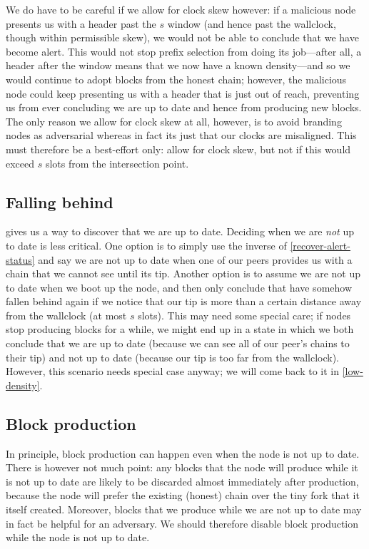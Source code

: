 We do have to be careful if we allow for clock skew however: if a malicious node
presents us with a header past the $s$ window (and hence past the wallclock,
though within permissible skew), we would not be able to conclude that we have
become alert. This would not stop prefix selection from doing its job---after
all, a header after the window means that we now have a known density---and so
we would continue to adopt blocks from the honest chain; however, the malicious
node could keep presenting us with a header that is just out of reach,
preventing us from ever concluding we are up to date and hence from producing
new blocks. The only reason we allow for clock skew at all, however, is to avoid
branding nodes as adversarial whereas in fact its just that our clocks are
misaligned. This must therefore be a best-effort only: allow for clock skew, but
not if this would exceed $s$ slots from the intersection point.

\subsection{Falling behind}

 gives us a way to discover that we are up to date.
Deciding when we are \emph{not} up to date is less critical. One option is to
simply use the inverse of \cref{recover-alert-status} and say we are not up to
date when one of our peers provides us with a chain that we cannot see until its
tip.  Another option is to assume we are not up to date when we boot up the
node, and then only conclude that have somehow fallen behind again if we notice
that our tip is more than a certain distance away from the wallclock (at most
$s$ slots). This may need some special care; if nodes stop producing blocks for
a while, we might end up in a state in which we both conclude that we are up to
date (because we can see all of our peer's chains to their tip) and not up to
date (because our tip is too far from the wallclock). However, this scenario
needs special case anyway; we will come back to it in \cref{low-density}.

\subsection{Block production}

In principle, block production can happen even when the node is not up to date.
There is however not much point: any blocks that the node will produce while it
is not up to date are likely to be discarded almost immediately after
production, because the node will prefer the existing (honest) chain over the
tiny fork that it itself created. Moreover, blocks that we produce while we are
not up to date may in fact be helpful for an adversary. We should therefore
disable block production while the node is not up to date.

